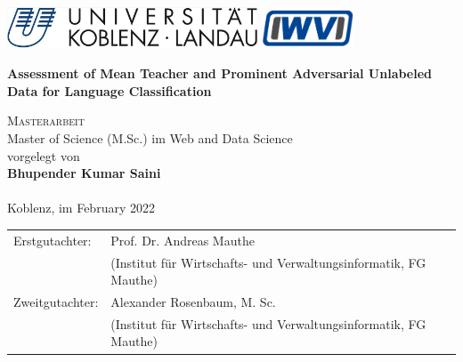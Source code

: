 
\begin{titlepage}
	\includegraphics[height=35pt]{img/uni-logo.png}
	\hfill
	\includegraphics[height=35pt]{img/iwvi.jpg}

	\begin{center}
	\vspace{2.5cm}	
	
	\huge\textbf{Assessment of Mean Teacher and Prominent Adversarial Unlabeled Data for Language Classification}
	


	\normalsize
	\vspace{1.5cm}	

	\textsc{\Large Masterarbeit}\\Master of Science (M.Sc.) im Web and Data Science\\[2cm] 
		
	vorgelegt von\\
	
	\textbf{\Large Bhupender Kumar Saini}\\ $ $$ $\\ [1.5cm] 
	
	Koblenz, im February 2022
	\end{center}
	\vfill
	\begin{tabular}{ll}
		Erstgutachter: & Prof. Dr. Andreas Mauthe\\ 
		 & \small{(Institut f\"ur Wirtschafts- und Verwaltungsinformatik, FG Mauthe)}\\
		Zweitgutachter: & Alexander Rosenbaum, M. Sc. \\ 
		& \small{(Institut f\"ur Wirtschafts- und Verwaltungsinformatik, FG Mauthe)}\\
	\end{tabular}
\end{titlepage}
